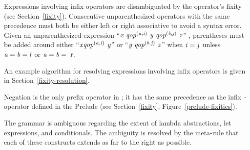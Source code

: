 
Expressions involving infix operators are disambiguated by the
operator's fixity (see Section~\ref{fixity}).  Consecutive
unparenthesized operators with the same precedence must both be either
left or right associative to avoid a syntax error.
Given an unparenthesized expression ``\mbox{$\it x\ qop^{(a,i)}\ y\ qop^{(b,j)}\ z$}'' 
, parentheses must be added around either ``\mbox{$\it x\\
\it qop^{(a,i)}\ y$}'' or ``\mbox{$\it y\ qop^{(b,j)}\ z$}'' when \mbox{$\it i=j$} unless \mbox{$\it a=b={\rm\\
\it l}$} or \mbox{$\it a=b={\rm\ r}$}.

An example algorithm for resolving expressions involving infix
operators is given in Section~\ref{fixity-resolution}.

Negation is the only prefix operator in
\Haskell{}; it has the same precedence as the infix \mbox{\tt -} operator
defined in the Prelude (see Section~\ref{fixity}, Figure~\ref{prelude-fixities}).

The grammar is ambiguous regarding the extent of lambda abstractions,
let expressions, and conditionals.  The ambiguity is resolved by the
meta-rule that each of these constructs extends as far to the right as
possible.  

